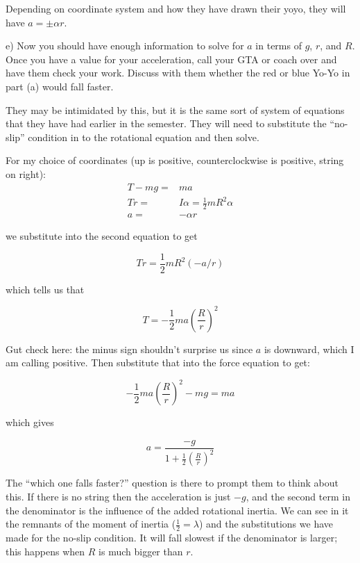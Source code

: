 \documentclass[12pt]{article}
\begin{document}
{\color{red}
Depending on coordinate system and how they have drawn their yoyo, they will have $a = \pm \alpha r$.
}


e) Now you should have enough information to solve for $a$ in terms of $g$, $r$, and $R$. Once you have a value for your acceleration, call your GTA or coach over and have them check your work. Discuss with them whether the red or blue Yo-Yo in part (a) would fall faster. 

{\color{blue}They may be intimidated by this, but it is the same sort of system of equations that they have had earlier in the semester. They will need to substitute the ``no-slip'' condition in to the rotational equation and then solve.}

{\color{red}
	
	For my choice of coordinates (up is positive, counterclockwise is positive, string on right):
		\begin{align*}
		T - mg =& ma \\
		Tr =& I \alpha = \frac{1}{2}mR^2 \alpha \\
		a =& - \alpha r
	\end{align*}

we substitute into the second equation to get 

$$Tr = \frac{1}{2}mR^2 (-a/r)$$

which tells us that 

$$T = -\frac{1}{2}ma \left( \frac{R}{r}\right)^2$$

Gut check here: the minus sign shouldn't surprise us since $a$ is downward, which I am calling positive. Then substitute that into the force equation to get:

$$
-\frac{1}{2}ma \left( \frac{R}{r}\right)^2 - mg = ma
$$

which gives

$$
a = \frac{-g}{1 + \frac{1}{2} \left(\frac{R}{r}\right)^2}
	$$
}

{
\color{blue}

The ``which one falls faster?'' question is there to prompt them to think about this. If there is no string then the acceleration is just $-g$, and the second term in the denominator is the influence of the added rotational inertia. We can see in it the remnants of the moment of inertia ($\frac{1}{2} = \lambda$) and the substitutions we have made for the no-slip condition. It will fall slowest if the denominator is larger; this happens when $R$ is much bigger than $r$.
}

\newpage
\end{document}
